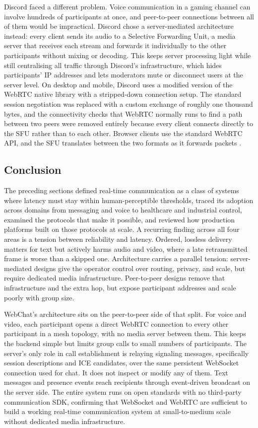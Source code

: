 \documentclass[12pt,a4paper]{article}
\begin{document}
Discord faced a different problem. Voice communication in a gaming channel can involve hundreds of participants at once, and peer-to-peer connections between all of them would be impractical. Discord chose a server-mediated architecture instead: every client sends its audio to a Selective Forwarding Unit, a media server that receives each stream and forwards it individually to the other participants without mixing or decoding. This keeps server processing light while still centralising all traffic through Discord's infrastructure, which hides participants' IP addresses and lets moderators mute or disconnect users at the server level. On desktop and mobile, Discord uses a modified version of the WebRTC native library with a stripped-down connection setup. The standard session negotiation was replaced with a custom exchange of roughly one thousand bytes, and the connectivity checks that WebRTC normally runs to find a path between two peers were removed entirely because every client connects directly to the SFU rather than to each other. Browser clients use the standard WebRTC API, and the SFU translates between the two formats as it forwards packets \citep{vass2018}.

\subsection{Conclusion}

The preceding sections defined real-time communication as a class of systems where latency must stay within human-perceptible thresholds, traced its adoption across domains from messaging and voice to healthcare and industrial control, examined the protocols that make it possible, and reviewed how production platforms built on those protocols at scale. A recurring finding across all four areas is a tension between reliability and latency. Ordered, lossless delivery matters for text but actively harms audio and video, where a late retransmitted frame is worse than a skipped one. Architecture carries a parallel tension: server-mediated designs give the operator control over routing, privacy, and scale, but require dedicated media infrastructure. Peer-to-peer designs remove that infrastructure and the extra hop, but expose participant addresses and scale poorly with group size.

WebChat's architecture sits on the peer-to-peer side of that split. For voice and video, each participant opens a direct WebRTC connection to every other participant in a mesh topology, with no media server between them. This keeps the backend simple but limits group calls to small numbers of participants. The server's only role in call establishment is relaying signaling messages, specifically session descriptions and ICE candidates, over the same persistent WebSocket connection used for chat. It does not inspect or modify any of them. Text messages and presence events reach recipients through event-driven broadcast on the server side. The entire system runs on open standards with no third-party communication SDK, confirming that WebSocket and WebRTC are sufficient to build a working real-time communication system at small-to-medium scale without dedicated media infrastructure.
\end{document}
